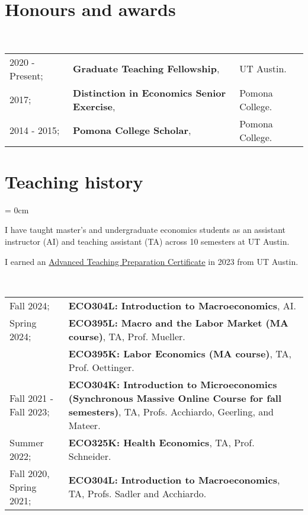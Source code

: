\documentclass[a4paper, 10pt]{article}
\begin{document}
  \section{Honours and awards}
  ~\begin{tabular}{lll}
    2020 - Present; & \textbf{Graduate Teaching Fellowship}, & UT Austin.\\
    2017; & \textbf{Distinction in Economics Senior Exercise}, & Pomona College.\\
    2014 - 2015; & \textbf{Pomona College Scholar}, & Pomona College.
  \end{tabular}
  \vspace*{0.25em}

  \section{Teaching history}\label{sec:teaching_history}
  \begin{compactitem}\parskip = 0cm
    \item I have taught master's and undergraduate economics students as an assistant instructor (AI) and teaching assistant (TA) across 10 semesters at UT Austin.
    \item I earned an \href{https://ctl.utexas.edu/teaching-preparation-series}{Advanced Teaching Preparation Certificate} in 2023 from UT Austin.
  \end{compactitem}
  \vspace*{0.70em}
  ~\begin{tabular}{p{3.5cm} p{12cm}}
    Fall 2024; & \textbf{ECO304L: Introduction to Macroeconomics}, AI.\\
    Spring 2024; & \textbf{ECO395L: Macro and the Labor Market (MA course)}, TA, Prof. Mueller.\\
    & \textbf{ECO395K: Labor Economics (MA course)}, TA, Prof. Oettinger.\\
    Fall 2021 - Fall 2023; & \textbf{ECO304K: Introduction to Microeconomics (Synchronous Massive Online Course for fall semesters)}, TA, Profs. Acchiardo, Geerling, and Mateer.\\
    Summer 2022; & \textbf{ECO325K: Health Economics}, TA, Prof. Schneider.\\
    Fall 2020, Spring 2021; & \textbf{ECO304L: Introduction to Macroeconomics}, TA, Profs. Sadler and Acchiardo.\\
  \end{tabular}
  \vspace*{-0.5em}
\end{document}
